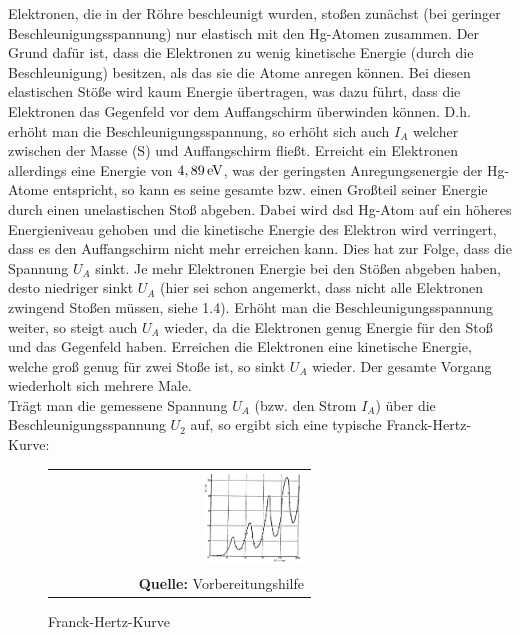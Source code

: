 \documentclass[a4paper,titlepage]{scrartcl}
\numberwithin{equation}{section}
\begin{document}
Elektronen, die in der Röhre beschleunigt wurden, stoßen zunächst (bei geringer Beschleunigungsspannung) nur elastisch mit den Hg-Atomen zusammen. Der Grund dafür ist, dass die Elektronen zu wenig kinetische Energie (durch die Beschleunigung) besitzen, als das sie die Atome anregen können. Bei diesen elastischen Stöße wird kaum Energie übertragen, was dazu führt, dass die Elektronen das Gegenfeld vor dem Auffangschirm überwinden können. D.h. erhöht man die Beschleunigungsspannung, so erhöht sich auch $I_A$ welcher zwischen der Masse (S) und Auffangschirm fließt. Erreicht ein Elektronen allerdings eine Energie von $\unit[4,89]{eV}$, was der geringsten Anregungsenergie der Hg-Atome entspricht, so kann es seine gesamte bzw. einen Großteil seiner Energie durch einen unelastischen Stoß abgeben. Dabei wird dsd Hg-Atom auf ein höheres Energieniveau gehoben und die kinetische Energie des Elektron wird verringert, dass es den Auffangschirm nicht mehr erreichen kann. Dies hat zur Folge, dass die Spannung $U_A$ sinkt. Je mehr Elektronen Energie bei den Stößen abgeben haben, desto niedriger sinkt $U_A$ (hier sei schon angemerkt, dass nicht alle Elektronen zwingend Stoßen müssen, siehe 1.4). Erhöht man die Beschleunigungsspannung weiter, so steigt auch $U_A$ wieder, da die Elektronen genug Energie für den Stoß und das Gegenfeld haben. Erreichen die Elektronen eine kinetische Energie, welche groß genug für zwei Stoße ist, so sinkt $U_A$ wieder. Der gesamte Vorgang wiederholt sich mehrere Male.\\
Trägt man die gemessene Spannung $U_A$ (bzw. den Strom $I_A$) über die Beschleunigungsspannung $U_2$ auf, so ergibt sich eine typische Franck-Hertz-Kurve:

\begin{figure}[H]
	\centering
	\begin{tabular}{@{}r@{}}
		\includegraphics[width=0.4\textwidth]{bilder/franck_hertz_kurve.jpg}\\
		\footnotesize\sffamily\textbf{Quelle:} Vorbereitungshilfe \cite{vorbereitungshilfe}
	\end{tabular}
    \label{fig:aufgabe11}
	\caption{Franck-Hertz-Kurve}
\end{figure}
\end{document}
